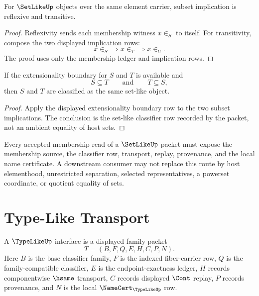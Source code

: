 \begin{theorem}
\label{thm:order-set-type-subset-preorder}
For $\SetLikeUp$ objects over the same element carrier, subset implication is
reflexive and transitive.
\end{theorem}

\begin{proof}
Reflexivity sends each membership witness $x\in_S$ to itself.  For
transitivity, compose the two displayed implication rows:
$$
x\in_S\Longrightarrow x\in_T\Longrightarrow x\in_U.
$$
The proof uses only the membership ledger and implication rows.
\end{proof}

\begin{theorem}
\label{thm:order-set-type-setlike-extensionality}
If the extensionality boundary for $S$ and $T$ is available and
$$
S\subseteq T
\qquad\text{and}\qquad
T\subseteq S,
$$
then $S$ and $T$ are classified as the same set-like object.
\end{theorem}

\begin{proof}
Apply the displayed extensionality boundary row to the two subset
implications.  The conclusion is the set-like classifier row recorded by the
packet, not an ambient equality of host sets.
\end{proof}

\begin{principle}
\label{prin:order-set-type-membership-generation}
Every accepted membership read of a $\SetLikeUp$ packet must expose the
membership source, the classifier row, transport, replay, provenance, and the
local name certificate.  A downstream consumer may not replace this route by
host elementhood, unrestricted separation, selected representatives, a
powerset coordinate, or quotient equality of sets.
\end{principle}

\section{Type-Like Transport}
\label{sec:order-set-type-typelike}

\begin{definition}
\label{def:order-set-type-typelike}
A $\TypeLikeUp$ interface is a displayed family packet
$$
T=(B,F,Q,E,H,C,P,N).
$$
Here $B$ is the base classifier family, $F$ is the indexed fiber-carrier row,
$Q$ is the family-compatible classifier, $E$ is the endpoint-exactness
ledger, $H$ records componentwise $\hsame$ transport, $C$ records displayed
$\Cont$ replay, $P$ records provenance, and $N$ is the local
$\NameCert_{\TypeLikeUp}$ row.
\end{definition}

